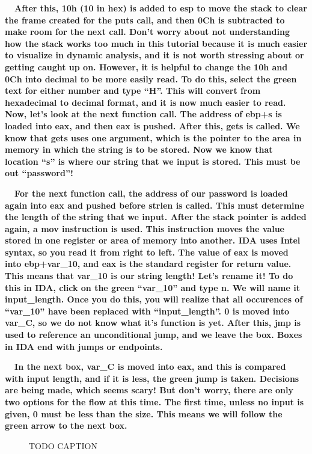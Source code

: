 \documentclass[letterpaper]{article}
\newcommand{\sitfig}[3]{
\begin{figure}[H]
\centering
\makebox[\textwidth][c]{
#2
}
\caption{#3}
\label{#1}
\end{figure}
}
\newcommand{\sitgfx}[4][scale=1.0]{
\sitfig{#3}{\texttt{[image: \#2]}}{#4}
}
\begin{document}
\textbf{ \ \ After this, 10h (10 in hex) is added to esp to move the stack to clear the frame created for the puts call,
and then 0Ch is subtracted to make room for the next call. Don't worry about not understanding how the stack works too
much in this tutorial because it is much easier to visualize in dynamic analysis, and it is not worth stressing about
or getting caught up on. However, it is helpful to change the 10h and 0Ch into decimal to be more easily read. To do
this, select the green text for either number and type ``H''. This will convert from hexadecimal to decimal format, and
it is now much easier to read. Now, let's look at the next function call. The address of ebp+s is loaded into eax, and
then eax is pushed. After this, gets is called. We know that gets uses one argument, which is the pointer to the area
in memory in which the string is to be stored. Now we know that location ``s'' is where our string that we input is
stored. This must be out ``password''!}

\textbf{ \ \ For the next function call, the address of our password is loaded again into eax and pushed before strlen
is called. This must determine the length of the string that we input. After the stack pointer is added again, a mov
instruction is used. This instruction moves the value stored in one register or area of memory into another. IDA uses
Intel syntax, so you read it from right to left. The value of eax is moved into ebp+var\_10, and eax is the standard
register for return value. This means that var\_10 is our string length! Let's rename it! To do this in IDA, click on
the green ``var\_10'' and type n. We will name it input\_length. Once you do this, you will realize that all occurences
of ``var\_10'' have been replaced with ``input\_length''. 0 is moved into var\_C, so we do not know what it's function
is yet. After this, jmp is used to reference an unconditional jump, and we leave the box. Boxes in IDA end with jumps
or endpoints.}

\textbf{ \ \ In the next box, var\_C is moved into eax, and this is compared with input length, and if it is less, the
green jump is taken. Decisions are being made, which seems scary! But don't worry, there are only two options for the
flow at this time. The first time, unless no input is given, 0 must be less than the size. This means we will follow
the green arrow to the next box. }  
\sitgfx[width=2.5937in,height=2.3335in]{FINALWORKINGDOCFORMERLYPRECURSOR-img048.png}{fig:unk}{TODO CAPTION}
 
\end{document}
